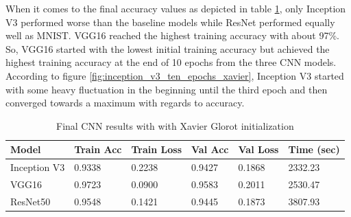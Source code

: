 \documentclass{article}
\theoremstyle{definition}
\theoremstyle{remark}
\begin{document}
When it comes to the final accuracy values as depicted in table \ref{tab:final_cnn_results_xavier}, only Inception V3 performed worse than the baseline models while ResNet performed equally well as MNIST. VGG16 reached the highest training accuracy with about 97\%. So, VGG16 started with the lowest initial training accuracy but achieved the highest training accuracy at the end of 10 epochs from the three CNN models.\\
According to figure \ref{fig:inception_v3_ten_epochs_xavier}, Inception V3 started with some heavy fluctuation in the beginning until the third epoch and then converged towards a maximum with regards to accuracy. 

\begin{table}[h!]
\center
\begin{tabular}{|l|l|l|l|l|l|}
\hline
\textbf{Model} & \textbf{Train Acc} & \textbf{Train Loss} & \textbf{Val Acc} & \textbf{Val Loss} & \textbf{Time (sec)}\\ \hline
Inception V3	& 0.9338 & 0.2238  & 0.9427	& 0.1868 &	2332.23\\ \hline
VGG16  		& 0.9723   & 0.0900   & 0.9583	&	0.2011 &  2530.47\\ \hline
ResNet50  	& 0.9548  & 0.1421 	& 0.9445 &	0.1873	 &  3807.93\\ \hline
\end{tabular}
\caption{Final CNN results with with Xavier Glorot initialization}
\label{tab:final_cnn_results_xavier}
\end{table}
\end{document}
